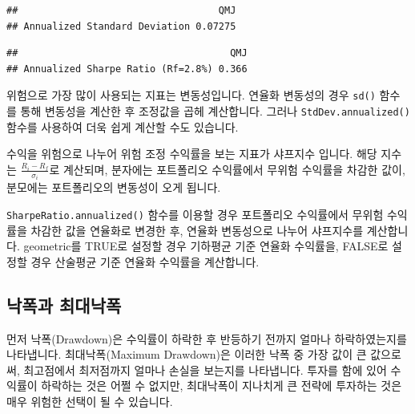 \documentclass[12pt,]{book}
\newenvironment{Shaded}{\begin{snugshade}}{\end{snugshade}}
\newcommand{\DataTypeTok}[1]{\textcolor[rgb]{0.13,0.29,0.53}{#1}}
\newcommand{\KeywordTok}[1]{\textcolor[rgb]{0.13,0.29,0.53}{\textbf{#1}}}
\newcommand{\NormalTok}[1]{#1}
\newcommand{\OperatorTok}[1]{\textcolor[rgb]{0.81,0.36,0.00}{\textbf{#1}}}
\newcommand{\OtherTok}[1]{\textcolor[rgb]{0.56,0.35,0.01}{#1}}
\begin{document}
\begin{verbatim}
##                                   QMJ
## Annualized Standard Deviation 0.07275
\end{verbatim}

\begin{Shaded}
\end{Shaded}

\begin{verbatim}
##                                     QMJ
## Annualized Sharpe Ratio (Rf=2.8%) 0.366
\end{verbatim}

위험으로 가장 많이 사용되는 지표는 변동성입니다. 연율화 변동성의 경우 \texttt{sd()} 함수를 통해 변동성을 계산한 후 조정값을 곱헤 계산합니다. 그러나 \texttt{StdDev.annualized()} 함수를 사용하여 더욱 쉽게 계산할 수도 있습니다.

수익을 위험으로 나누어 위험 조정 수익률을 보는 지표가 샤프지수 입니다. 해당 지수는 \(\frac {R_i - R_f}{\sigma_i}\)로 계산되며, 분자에는 포트폴리오 수익률에서 무위험 수익률을 차감한 값이, 분모에는 포트폴리오의 변동성이 오게 됩니다.

\texttt{SharpeRatio.annualized()} 함수를 이용할 경우 포트폴리오 수익률에서 무위험 수익률을 차감한 값을 연율화로 변경한 후, 연율화 변동성으로 나누어 샤프지수를 계산합니다. geometric를 TRUE로 설정할 경우 기하평균 기준 연율화 수익률을, FALSE로 설정할 경우 산술평균 기준 연율화 수익률을 계산합니다.

\hypertarget{section-88}{%
\subsection{낙폭과 최대낙폭}\label{section-88}}

먼저 낙폭(Drawdown)은 수익률이 하락한 후 반등하기 전까지 얼마나 하락하였는지를 나타냅니다. 최대낙폭(Maximum Drawdown)은 이러한 낙폭 중 가장 값이 큰 값으로써, 최고점에서 최저점까지 얼마나 손실을 보는지를 나타냅니다. 투자를 함에 있어 수익률이 하락하는 것은 어쩔 수 없지만, 최대낙폭이 지나치게 큰 전략에 투자하는 것은 매우 위험한 선택이 될 수 있습니다.
\end{document}
